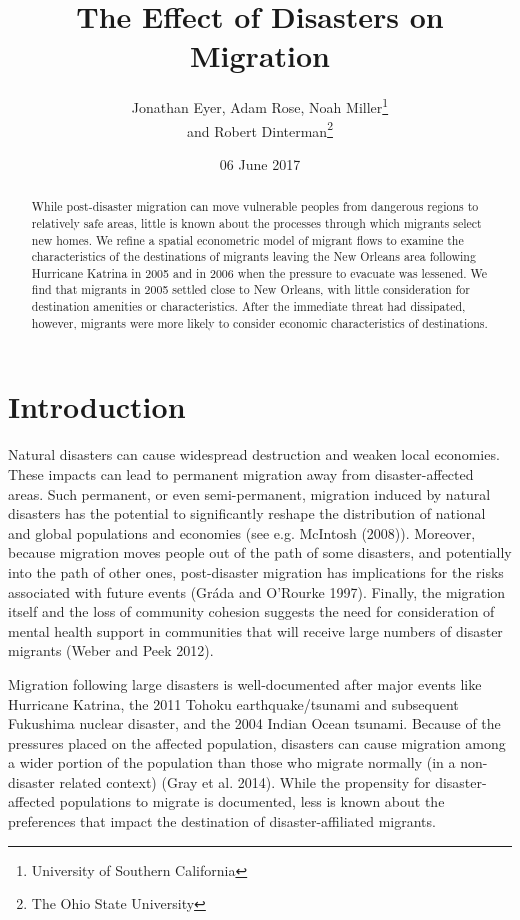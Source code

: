 \documentclass[]{article}
\title{The Effect of Disasters on Migration}
\author{Jonathan Eyer, Adam Rose, Noah Miller\footnote{University of Southern
  California} \\ and Robert Dinterman\footnote{The Ohio State University}}
\date{06 June 2017}
\begin{document}
\maketitle
\begin{abstract}
While post-disaster migration can move vulnerable peoples from dangerous
regions to relatively safe areas, little is known about the processes
through which migrants select new homes. We refine a spatial econometric
model of migrant flows to examine the characteristics of the
destinations of migrants leaving the New Orleans area following
Hurricane Katrina in 2005 and in 2006 when the pressure to evacuate was
lessened. We find that migrants in 2005 settled close to New Orleans,
with little consideration for destination amenities or characteristics.
After the immediate threat had dissipated, however, migrants were more
likely to consider economic characteristics of destinations.
\end{abstract}

\newpage

\section{Introduction}\label{introduction}

Natural disasters can cause widespread destruction and weaken local
economies. These impacts can lead to permanent migration away from
disaster-affected areas. Such permanent, or even semi-permanent,
migration induced by natural disasters has the potential to
significantly reshape the distribution of national and global
populations and economies (see e.g. McIntosh (2008)). Moreover, because
migration moves people out of the path of some disasters, and
potentially into the path of other ones, post-disaster migration has
implications for the risks associated with future events (Gráda and
O'Rourke 1997). Finally, the migration itself and the loss of community
cohesion suggests the need for consideration of mental health support in
communities that will receive large numbers of disaster migrants (Weber
and Peek 2012).

Migration following large disasters is well-documented after major
events like Hurricane Katrina, the 2011 Tohoku earthquake/tsunami and
subsequent Fukushima nuclear disaster, and the 2004 Indian Ocean
tsunami. Because of the pressures placed on the affected population,
disasters can cause migration among a wider portion of the population
than those who migrate normally (in a non-disaster related context)
(Gray et al. 2014). While the propensity for disaster-affected
populations to migrate is documented, less is known about the
preferences that impact the destination of disaster-affiliated migrants.
\end{document}
